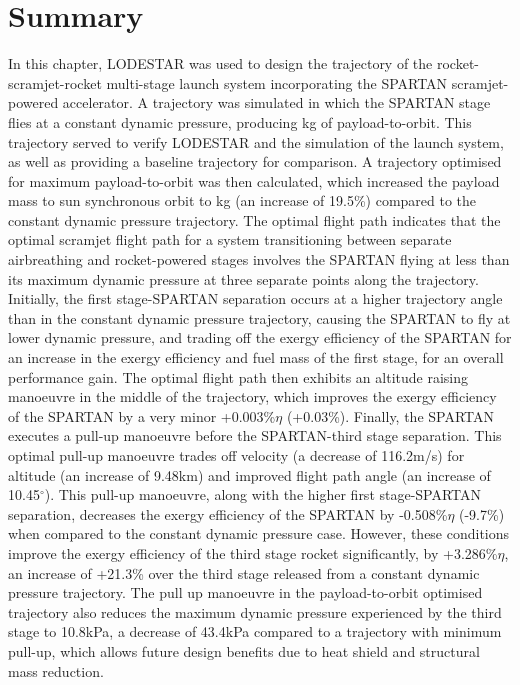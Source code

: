 \section{Summary}


In this chapter, LODESTAR was used to design the trajectory of the rocket-scramjet-rocket multi-stage launch system incorporating the SPARTAN scramjet-powered accelerator. 
A trajectory was simulated in which the SPARTAN stage flies at a constant dynamic pressure, producing \PayloadToOrbitConstqNoReturn kg of payload-to-orbit. This trajectory served to verify LODESTAR and the simulation of  the launch system, as well as providing a baseline trajectory for comparison. 
A trajectory optimised for maximum payload-to-orbit was then calculated, which increased the payload mass to sun synchronous orbit to \PayloadToOrbitStandardNoReturn kg (an increase of 19.5\%) compared to the constant dynamic pressure trajectory.
  The optimal flight path indicates that the optimal scramjet flight path for a system transitioning between separate airbreathing and rocket-powered stages involves the SPARTAN flying at less than its maximum dynamic pressure at three separate points along the trajectory. 
  Initially, the first stage-SPARTAN separation occurs at a higher trajectory angle than in the constant dynamic pressure trajectory, causing the SPARTAN to fly at lower dynamic pressure, and trading off the exergy efficiency of the SPARTAN for an increase in the exergy efficiency and fuel mass of the first stage, for an overall performance gain. 
  The optimal flight path then exhibits an altitude raising manoeuvre in the middle of the trajectory, which improves the exergy efficiency of the SPARTAN by a very minor +0.003\%$\eta$ (+0.03\%). 
  Finally, the SPARTAN executes a pull-up manoeuvre before the SPARTAN-third stage separation. This optimal pull-up manoeuvre trades off velocity (a decrease of 116.2m/s) for altitude (an increase of 9.48km) and improved flight path angle (an increase of 10.45$^\circ$). This pull-up manoeuvre, along with the higher first stage-SPARTAN separation, decreases the exergy efficiency of the SPARTAN by -0.508\%$\eta$ (-9.7\%) when compared to the constant dynamic pressure case. 
  However, these conditions improve the exergy efficiency of the third stage rocket significantly, by +3.286\%$\eta$, an increase of +21.3\% over the third stage released from a constant dynamic pressure trajectory. 
 The pull up manoeuvre in the payload-to-orbit optimised trajectory also reduces the maximum dynamic pressure experienced by the third stage to 10.8kPa, a decrease of 43.4kPa compared to a trajectory with minimum pull-up, which allows future design benefits due to heat shield and structural mass reduction.  

